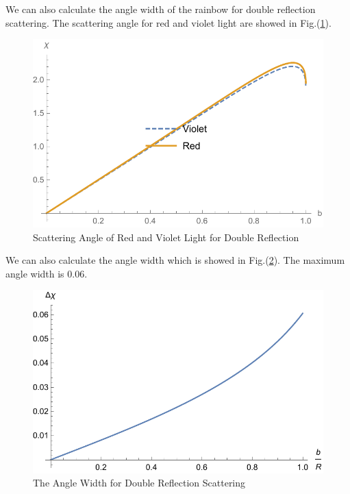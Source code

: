 \documentclass[%
 reprint,
 amsmath,amssymb,
 aps,
]{revtex4-1}
\begin{document}
We can also calculate the angle width of the rainbow for double reflection scattering. The scattering angle for red and violet light are showed in Fig.(\ref{doublerednandviolet}).
\begin{figure}
    \centering
    \includegraphics[scale=0.6]{redandvioletdouble.pdf}
    \caption{Scattering Angle of Red and Violet Light for Double Reflection}
    \label{doublerednandviolet}
\end{figure}
We can also calculate the angle width which is showed in Fig.(\ref{doubleanglewidth}). The maximum angle width is $0.06$.

\begin{figure}
    \centering
    \includegraphics[scale=0.6]{doubleanglewidth.pdf}
    \caption{The Angle Width for Double Reflection Scattering}
    \label{doubleanglewidth}
\end{figure}
\end{document}
